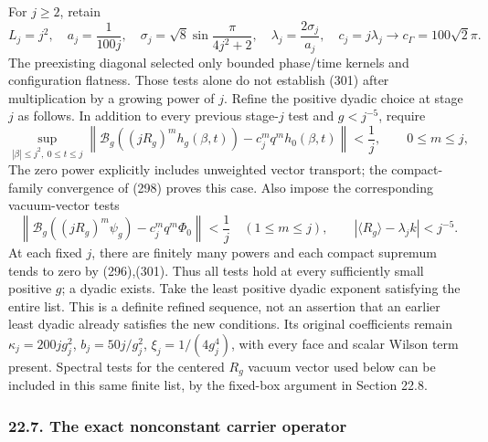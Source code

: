\documentclass[
  11pt,
]{article}
\begin{document}
For \(j\ge2\), retain \[
 L_j=j^2,\quad a_j=\frac1{100j},\quad
 \sigma_j=\sqrt8\sin\frac{\pi}{4j^2+2},\quad
 \lambda_j=\frac{2\sigma_j}{a_j},\quad
 c_j=j\lambda_j\longrightarrow c_\Gamma=100\sqrt2\pi.
\] The preexisting diagonal selected only bounded phase/time kernels and
configuration flatness. Those tests alone do not establish (301) after
multiplication by a growing power of \(j\). Refine the positive dyadic
choice at stage \(j\) as follows. In addition to every previous
stage-\(j\) test and \(g<j^{-5}\), require \[
 \sup_{|\beta|\le j^2,\ 0\le t\le j}
 \left\|\mathcal B_g((jR_g)^m h_g(\beta,t))
                   -c_j^m q^m h_0(\beta,t)\right\|<\frac1j,
 \qquad 0\le m\le j,
 \tag{302}
\] The zero power explicitly includes unweighted vector transport; the
compact-family convergence of (298) proves this case. Also impose the
corresponding vacuum-vector tests \[
 \left\|\mathcal B_g((jR_g)^m\psi_g)
                   -c_j^m q^m\Phi_0\right\|<\frac1j
 \quad(1\le m\le j),\qquad
 |\langle R_g\rangle-\lambda_j k|<j^{-5}.
 \tag{303}
\] At each fixed \(j\), there are finitely many powers and each compact
supremum tends to zero by (296),(301). Thus all tests hold at every
sufficiently small positive \(g\); a dyadic exists. Take the least
positive dyadic exponent satisfying the entire list. This is a definite
refined sequence, not an assertion that an earlier least dyadic already
satisfies the new conditions. Its original coefficients remain
\(\kappa_j=200jg_j^2\), \(b_j=50j/g_j^2\), \(\xi_j=1/(4g_j^4)\), with
every face and scalar Wilson term present. Spectral tests for the
centered \(R_g\) vacuum vector used below can be included in this same
finite list, by the fixed-box argument in Section 22.8.

\subsubsection{22.7. The exact nonconstant carrier
operator}\label{the-exact-nonconstant-carrier-operator}
\end{document}
